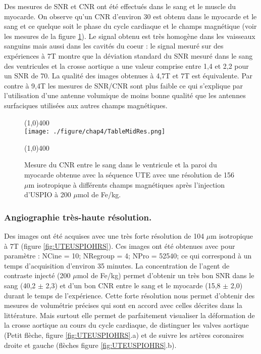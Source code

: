 Des mesures de SNR et CNR ont été effectués dans le sang et le muscle du myocarde. On observe qu'un CNR d'environ 30 est obtenu dans le myocarde et le sang et ce quelque soit le phase du cycle cardiaque et le champs magnétique (voir les mesures de la figure \ref{fig:TableMidRes}). Le signal obtenu est très homogène dans les vaisseaux sanguins mais aussi dans les cavités du coeur : le signal mesuré sur des expériences à 7T montre que la déviation standard du SNR mesuré dans le sang des ventricules et la crosse aortique a une valeur comprise entre 1,4 et 2,2 pour un SNR de 70. La qualité des images obtenues à 4,7T et 7T est équivalente. Par contre à 9,4T les mesures de SNR/CNR sont plus faible ce qui s'explique par l'utilisation d'une antenne volumique de moins bonne qualité que les antennes surfaciques utilisées aux autres champs magnétiques.

\begin{figure}[H]
\centering
\line(1,0){400} \\
\texttt{[image: ./figure/chap4/TableMidRes.png]}
\caption[Table SNR CNR Résolution moyenne]{\label{fig:TableMidRes} Mesure du CNR entre le sang dans le ventricule et la paroi du myocarde obtenue avec la séquence UTE avec une résolution de 156 $\mu$m isotropique à différents champs magnétiques après l'injection d'USPIO à 200 $\mu$mol de Fe/kg.}
\line(1,0){400} \\ 
\end{figure}

\subsubsection{Angiographie très-haute résolution.}

Des images ont été acquises avec une très forte résolution de 104 $\mu$m isotropique à 7T (figure \ref{fig:UTEUSPIOHRS}). Ces images ont été obtenues avec pour paramètre : NCine = 10; NRegroup = 4; NPro = 52540; ce qui correspond à un temps d'acquisition d'environ 35 minutes.
La concentration de l'agent de contraste injecté (200 $\mu$mol de Fe/kg) permet d'obtenir un très bon SNR dans le sang (40,2 $\pm$ 2,3) et d'un bon CNR entre le sang et le myocarde (15,8 $\pm$ 2,0) durant le temps de l'expérience.
Cette forte résolution nous permet d'obtenir des mesures de volumétrie précises qui sont en accord avec celles décrites dans la littérature. Mais surtout elle permet de parfaitement visualiser la déformation de la crosse aortique au cours du cycle cardiaque, de distinguer les valves aortique (Petit flèche, figure \ref{fig:UTEUSPIOHRS}.a) et de suivre les artères coronaires droite et gauche (flèches figure \ref{fig:UTEUSPIOHRS}.b).

